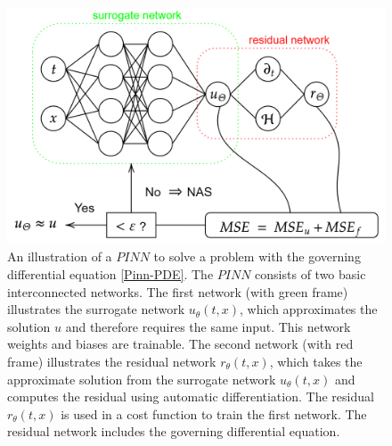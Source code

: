 \begin{figure}[H]
    \begin{center}
        \includegraphics[scale=0.3]{img/diagram-20220212.png}
    \end{center}
    \caption{An illustration of a $PINN$ to solve a problem with the governing differential equation \cref{Pinn-PDE}. The $PINN$ consists of two basic interconnected networks. The first network (with green frame) illustrates the surrogate network $u_\theta\left(t,x\right)$, which approximates the solution $u$ and therefore requires the same input. This network weights and biases are trainable. The second network (with red frame) illustrates the residual network $r_\theta\left(t,x\right)$, which takes the approximate solution from the surrogate network $u_\theta\left(t,x\right)$ and computes the residual using automatic differentiation. The residual $r_\theta\left(t,x\right)$ is used in a cost function to train the first network. The residual network includes the governing differential equation.}
    \label{fig6}
\end{figure}

